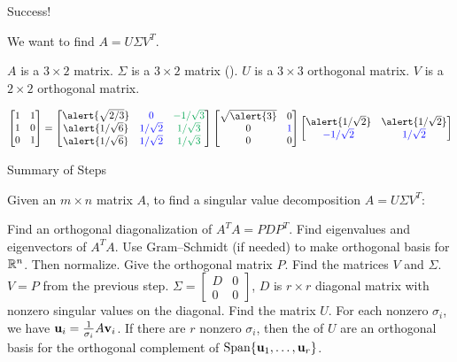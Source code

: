 \documentclass[xcolor=dvipsnames,aspectratio=169,t]{beamer}
\begin{document}
\begin{frame}{Success!}
  \medskip

  We want to find $A = U\Sigma V^T$.
  \medskip

  \bi
  \ii $A$ is a $3 \times 2$ matrix.
  \ii $\Sigma$ is a $3 \times 2$ matrix ().
  \ii $U$ is a $3 \times 3$ orthogonal matrix.
  \ii $V$ is a $2 \times 2$ orthogonal matrix.
  \ei

  \[  \begin{bmatrix} 1 & 1 \\ 1 & 0 \\ 0 & 1 \end{bmatrix} = \begin{bmatrix} \alert{\sqrt{2/3}}  &  \colorb{0} & \colorg{ -1/\sqrt{3}}\\ \alert{1/\sqrt{6}} & \colorb{1/\sqrt{2}} &  \colorg{1/\sqrt{3}}\\  \alert{1/\sqrt{6}} & \colorb{1/\sqrt{2}} &  \colorg{1/\sqrt{3}}\end{bmatrix} 
  \begin{bmatrix} \sqrt{\alert{3}} & 0 \\ 0 & \colorb{1} \\ 0 & 0 \end{bmatrix}
  \begin{bmatrix} \alert{1/\sqrt{2}} & \alert{1/\sqrt{2}} \\  \colorb{-1/\sqrt{2}} & \colorb{1/\sqrt{2}} \end{bmatrix}\]
\end{frame}


\begin{frame}{Summary of Steps}
  \smallskip

  Given an $m \times n$ matrix $A$, to find a singular value decomposition $A = U \Sigma V^T$:

  \bb
  \ii  Find an \alert{orthogonal diagonalization} of $A^TA= PDP^T$.
  \bi
  \ii Find eigenvalues and eigenvectors of $A^TA$.
  \ii Use Gram--Schmidt (if needed) to make orthogonal basis for $\mathbb{R}^n$. Then normalize.
  \ii Give the \alert{orthogonal matrix} $P$. 
  \ei \medskip
  \ii Find the matrices $V$ and $\Sigma$.
  \bi
  \ii $V = P$ from the previous step.
  \ii $\Sigma = \begin{bmatrix} D & 0 \\ 0 & 0 \end{bmatrix}$, $D$ is $r \times r$ diagonal matrix with nonzero singular values on the diagonal.
  \ei \medskip
  \ii Find the matrix $U$.
  \bi
  \ii For each nonzero $\sigma_i$, we have $\mathbf{u}_i = \frac{1}{\sigma_i} A\mathbf{v}_i$.
  \smallskip
  \ii If there are $r$ nonzero $\sigma_i$, then the  of $U$ are an orthogonal basis for the orthogonal complement of $\mbox{Span}\{\mathbf{u}_1,\ldots,\mathbf{u}_r\}$.
  \ei
  \ee
\end{frame}
\end{document}
